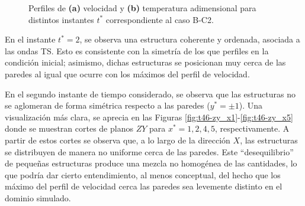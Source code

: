 \newpage

\begin{figure}[H]
  \centering  
  
  \caption{Perfiles de \textbf{(a)} velocidad y \textbf{(b)} temperatura adimensional para distintos instantes $t^*$ correspondiente al caso B-C2.}
    \label{fig:mosaico-bc2}
\end{figure}




En el instante $t^* = 2$, se observa una estructura coherente y ordenada, asociada a las ondas TS. Esto es consistente con la simetría de los que perfiles en la condición inicial; asimismo, dichas estructuras se posicionan muy cerca de las paredes al igual que ocurre con los máximos del perfil de velocidad.

En el segundo instante de tiempo considerado, se observa que las estructuras no se \linebreak aglomeran de forma simétrica respecto a las paredes ($y^*=\pm 1$). Una visualización más clara, se aprecia en las Figuras \ref{fig:t46-zy_x1}-\ref{fig:t46-zy_x5} donde se muestran cortes de planos $ZY$ para $x^*=1,2,4,5$, respectivamente. A partir de estos cortes se observa que, a lo largo de la dirección $X$, las estructuras se distribuyen de manera no uniforme cerca de las paredes. Este ``desequilibrio'' de pequeñas estructuras produce una mezcla no homogénea de las cantidades, lo que podría dar cierto entendimiento, al menos conceptual, del hecho que los máximo del perfil de velocidad cerca las paredes sea levemente distinto en el dominio simulado.   

